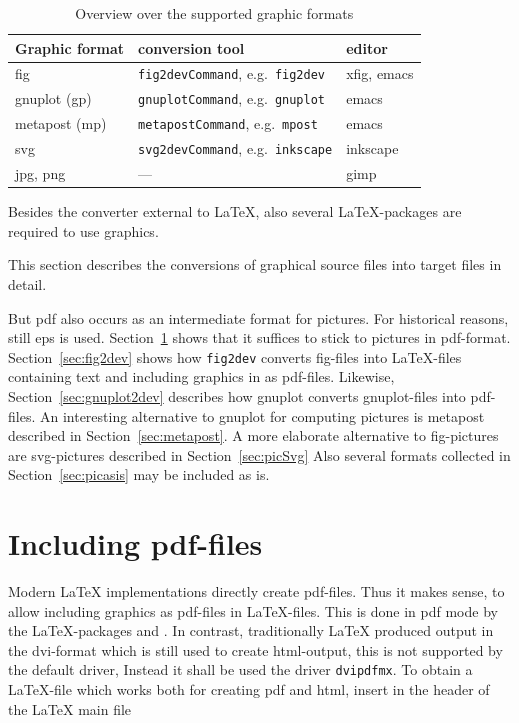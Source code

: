 \documentclass[12pt]{book}
\newcommand{\gls}[1]{#1}
\begin{document}
\begin{longtable}{|l|ll|}
\toprule
Graphic format & conversion tool & editor \\
\midrule
\midrule
\endfirsthead%
\bottomrule
\caption{\label{tab:graphicOverview} 
Overview over the supported graphic formats }
\endlastfoot%
fig             & \texttt{fig2devCommand}, e.g.~\texttt{fig2dev}  & xfig, emacs   \\
gnuplot (gp)    & \texttt{gnuplotCommand}, e.g.~\texttt{gnuplot}  & emacs         \\
metapost (mp)   & \texttt{metapostCommand}, e.g.~\texttt{mpost}   & emacs         \\
svg             & \texttt{svg2devCommand}, e.g.~\texttt{inkscape} & inkscape      \\
jpg, png        & ---        & gimp          \\
\end{longtable}

Besides the converter external to \LaTeX, 
also several \LaTeX-packages are required 
to use graphics. 


This section describes the conversions of 
graphical source files into target files 
in detail. 

But pdf also occurs as an intermediate format for pictures. 
For historical reasons, still \gls{eps} is used. 
Section~\ref{sec:figpdf} shows that it suffices to stick to pictures 
in pdf-format. 
Section~\ref{sec:fig2dev} shows how \texttt{fig2dev} converts fig-files 
into \LaTeX-files containing text and including graphics in as pdf-files. 
Likewise, Section~\ref{sec:gnuplot2dev} describes 
how gnuplot converts gnuplot-files into pdf-files. 
An interesting alternative to gnuplot for computing pictures 
is metapost described in Section~\ref{sec:metapost}. 
A more elaborate alternative to fig-pictures are svg-pictures 
described in Section~\ref{sec:picSvg}
Also several formats collected in Section~\ref{sec:picasis} 
may be included as is. 



\section{Including pdf-files}\label{sec:figpdf}

Modern \LaTeX{} implementations directly create pdf-files. 
Thus it makes sense, to allow including graphics as pdf-files 
in \LaTeX-files. 
This is done in pdf mode 
by the \LaTeX-packages  and . 
In contrast, traditionally \LaTeX{} produced output in the \gls{dvi}-format 
which is still used to create \gls{html}-output, 
this is not supported by the default driver, 
Instead it shall be used the driver \texttt{dvipdfmx}. 
To obtain a \LaTeX-file which works both for creating pdf and html, 
insert in the header of the \LaTeX{} main file 
%
\lstset{language=tex, basicstyle=\small}%

\end{document}
